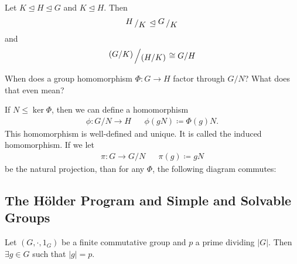\documentclass[a5paper]{article}
\begin{document}
\begin{theorem}
  Let $K\trianglelefteq H\trianglelefteq G$ and $K\trianglelefteq H$. Then
  \begin{equation*}
    \quotient{H}{K}\trianglelefteq \quotient{G}{K}
  \end{equation*}
  and
  \begin{equation*}
    \quotient{(G/K)}{(H/K)}\cong G/H
  \end{equation*}
\end{theorem}

\begin{note}
  \begin{field}
    When does a group homomorphism $\Phi:G\to H$ factor through $G/N$? What does
    that even mean?
  \end{field}

  \begin{field}
    If $N\leqslant\ker\Phi$, then we can define a homomorphism
    \begin{align*}
      \phi:G/N\longrightarrow H && \phi(gN)\coloneqq \Phi(g)N.
    \end{align*}
    This homomorphism is well-defined and unique. It is called the induced
    homomorphism. If we let
    \begin{align*}
      \pi:G\longrightarrow G/N && \pi(g)\coloneqq gN
    \end{align*}
    be the natural projection, than for any $\Phi$, the following diagram commutes:
    \begin{center}
    \end{center}
  \end{field}
\end{note}

\subsection{The H\"older Program and Simple and Solvable Groups}
\begin{lemma}
	Let $(G,\cdot,1_G)$ be a finite commutative group and $p$ a prime dividing
  $|G|$. Then $\exists g\in G$ such that $|g|=p$.
\end{lemma}
\end{document}
